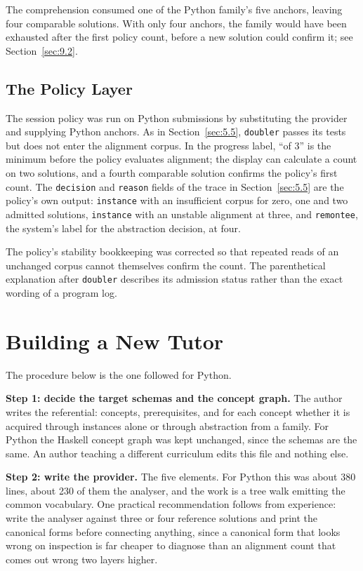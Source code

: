 \documentclass[journal]{IEEEtran}
\begin{document}
The comprehension consumed one of the Python family's five anchors,
leaving four comparable solutions. With only four anchors, the family
would have been exhausted after the first policy count, before a new
solution could confirm it; see Section~\ref{sec:9.2}.

\subsection{The Policy Layer}\label{sec:5.6}
The session policy was run on Python submissions by substituting the
provider and supplying Python anchors. As in Section~\ref{sec:5.5}, \texttt{doubler}
passes its tests but does not enter the alignment corpus. In the progress
label, ``of 3'' is the minimum before the policy evaluates alignment;
the display can calculate a count on two solutions, and a fourth
comparable solution confirms the policy's first count. The
\texttt{decision} and \texttt{reason} fields of the trace in Section~\ref{sec:5.5} are
the policy's own output: \texttt{instance} with an insufficient corpus for
zero, one and two admitted solutions, \texttt{instance} with an unstable
alignment at three, and \texttt{remontee}, the system's label for the
abstraction decision, at four.



The policy's stability bookkeeping was corrected so that repeated reads
of an unchanged corpus cannot themselves confirm the count. The
parenthetical explanation after \texttt{doubler} describes its admission
status rather than the exact wording of a program log.

\section{Building a New Tutor}\label{sec:6}
The procedure below is the one followed for Python.

\textbf{Step 1: decide the target schemas and the concept graph.} The author writes the referential: concepts, prerequisites, and for each concept whether it is acquired through instances alone or through abstraction from a family. For Python the Haskell concept graph was kept unchanged, since the schemas are the same. An author teaching a different curriculum edits this file and nothing else.

\textbf{Step 2: write the provider.} The five elements. For Python this was about 380 lines, about 230 of them the analyser, and the work is a tree walk emitting the common vocabulary. One practical recommendation follows from experience: write the analyser against three or four reference solutions and print the canonical forms before connecting anything, since a canonical form that looks wrong on inspection is far cheaper to diagnose than an alignment count that comes out wrong two layers higher.
\end{document}
